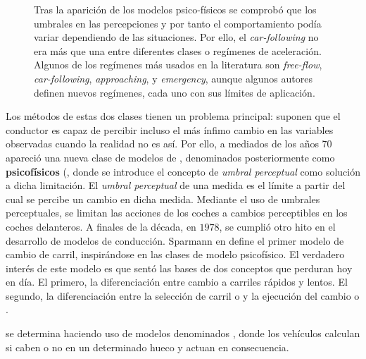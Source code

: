 \begin{figure}
	\centering
	\caption{Tras la aparición de los modelos psico-físicos se comprobó que los umbrales en las percepciones y por tanto el comportamiento podía variar dependiendo de las situaciones. Por ello, el \textit{car-following} no era más que una entre diferentes clases o regímenes de aceleración. Algunos de los regímenes más usados en la literatura son \textit{free-flow}, \textit{car-following}, \textit{approaching}, y \textit{emergency}, aunque algunos autores definen nuevos regímenes, cada uno con sus límites de aplicación.}
	\label{fig:acceleration-model-classes}
\end{figure}

Los métodos de estas dos clases tienen un problema principal: suponen que el conductor es capaz de percibir incluso el más ínfimo cambio en las variables observadas cuando la realidad no es así. Por ello, a mediados de los años $70$ apareció una nueva clase de modelos de \textit{}, denominados posteriormente como \textbf{psicofísicos} (\cite{wiedemann1974simulation}, donde se introduce el concepto de \textit{umbral perceptual} como solución a dicha limitación. El \textit{umbral perceptual} de una medida es el límite a partir del cual se percibe un cambio en dicha medida. Mediante el uso de umbrales perceptuales, se limitan las acciones de los coches a cambios perceptibles en los coches delanteros.
A finales de la década, en $1978$, se cumplió otro hito en el desarrollo de modelos de conducción. Sparmann en \cite{Sparmann1978} define el primer modelo de cambio de carril, inspirándose en las clases de modelo psicofísico. El verdadero interés de este modelo es que sentó las bases de dos conceptos que perduran hoy en día. El primero, la diferenciación entre cambio a carriles rápidos y lentos. El segundo, la diferenciación entre la selección de carril o \textit{} y la ejecución del cambio o \textit{}.

 se determina haciendo uso de modelos denominados \textit{}, donde los vehículos calculan si caben o no en un determinado hueco y actuan en consecuencia.

